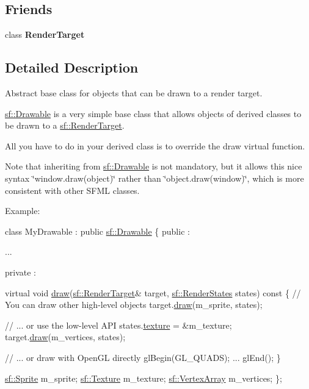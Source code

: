 \subsection*{Friends}
\begin{DoxyCompactItemize}
\item 
\hypertarget{classsf_1_1Drawable_aa5afc6f82b7b587ed5ada4d227ce32aa}{class {\bfseries Render\-Target}}\label{classsf_1_1Drawable_aa5afc6f82b7b587ed5ada4d227ce32aa}

\end{DoxyCompactItemize}


\subsection{Detailed Description}
Abstract base class for objects that can be drawn to a render target. 

\hyperlink{classsf_1_1Drawable}{sf\-::\-Drawable} is a very simple base class that allows objects of derived classes to be drawn to a \hyperlink{classsf_1_1RenderTarget}{sf\-::\-Render\-Target}.

All you have to do in your derived class is to override the draw virtual function.

Note that inheriting from \hyperlink{classsf_1_1Drawable}{sf\-::\-Drawable} is not mandatory, but it allows this nice syntax \char`\"{}window.\-draw(object)\char`\"{} rather than \char`\"{}object.\-draw(window)\char`\"{}, which is more consistent with other S\-F\-M\-L classes.

Example\-: 
\begin{DoxyCode}
\textcolor{keyword}{class }MyDrawable : \textcolor{keyword}{public} \hyperlink{classsf_1_1Drawable}{sf::Drawable}
\{
\textcolor{keyword}{public} :

   ...

private :

    \textcolor{keyword}{virtual} \textcolor{keywordtype}{void} \hyperlink{classsf_1_1Drawable_a90d2c88bba9b035a0844eccb380ef631}{draw}(\hyperlink{classsf_1_1RenderTarget}{sf::RenderTarget}& target, 
      \hyperlink{classsf_1_1RenderStates}{sf::RenderStates} states)\textcolor{keyword}{ const}
\textcolor{keyword}{    }\{
        \textcolor{comment}{// You can draw other high-level objects}
        target.\hyperlink{classsf_1_1RenderTarget_a12417a3bcc245c41d957b29583556f39}{draw}(m\_sprite, states);

        \textcolor{comment}{// ... or use the low-level API}
        states.\hyperlink{classsf_1_1RenderStates_a457fc5a41731889de9cf39cf9b3436c3}{texture} = &m\_texture;
        target.\hyperlink{classsf_1_1RenderTarget_a12417a3bcc245c41d957b29583556f39}{draw}(m\_vertices, states);

        \textcolor{comment}{// ... or draw with OpenGL directly}
        glBegin(GL\_QUADS);
        ...
        glEnd();
    \}

    \hyperlink{classsf_1_1Sprite}{sf::Sprite} m\_sprite;
    \hyperlink{classsf_1_1Texture}{sf::Texture} m\_texture;
    \hyperlink{classsf_1_1VertexArray}{sf::VertexArray} m\_vertices;
\};
\end{DoxyCode}


